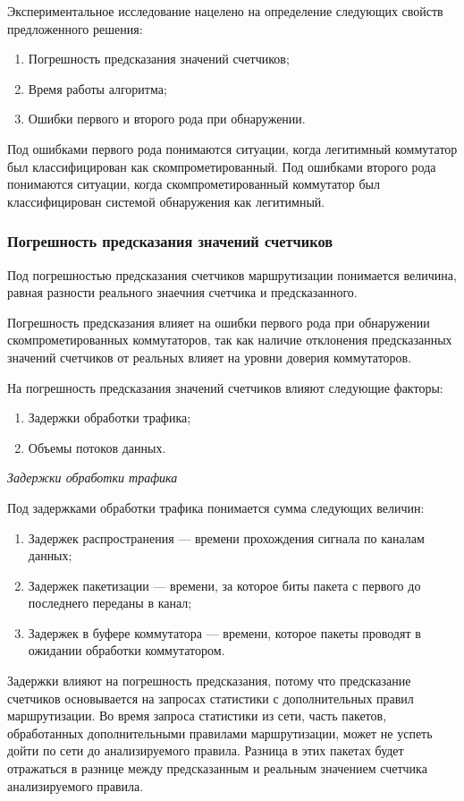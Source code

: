 \documentclass[../thesis.tex]{subfiles}
\begin{document}
Экспериментальное исследование нацелено на определение следующих свойств предложенного решения:
\begin{enumerate}
\item Погрешность предсказания значений счетчиков;
\item Время работы алгоритма;
\item Ошибки первого и второго рода при обнаружении.
\end{enumerate}

Под ошибками первого рода понимаются ситуации, когда легитимный коммутатор был классифицирован как скомпрометированный.
Под ошибками второго рода понимаются ситуации, когда скомпрометированный коммутатор был классифицирован системой обнаружения как легитимный.

\subsubsection{Погрешность предсказания значений счетчиков}

Под погрешностью предсказания счетчиков маршрутизации понимается величина, равная разности реального знаечния счетчика и предсказанного.

Погрешность предсказания влияет на ошибки первого рода при обнаружении скомпрометированных коммутаторов, так как наличие отклонения предсказанных значений счетчиков от реальных влияет на уровни доверия коммутаторов.

На погрешность предсказания значений счетчиков влияют следующие факторы:
\begin{enumerate}
\item Задержки обработки трафика;
\item Объемы потоков данных.
\end{enumerate}

\textit{Задержки обработки трафика}

Под задержками обработки трафика понимается сумма следующих величин:
\begin{enumerate}
\item Задержек распространения --- времени прохождения сигнала по каналам данных;
\item Задержек пакетизации --- времени, за которое биты пакета с первого до последнего переданы в канал;
\item Задержек в буфере коммутатора --- времени, которое пакеты проводят в ожидании обработки коммутатором.
\end{enumerate}

Задержки влияют на погрешность предсказания, потому что предсказание счетчиков основывается на запросах статистики с дополнительных правил маршрутизации.
Во время запроса статистики из сети, часть пакетов, обработанных дополнительными правилами маршрутизации, может не успеть дойти по сети до анализируемого правила.
Разница в этих пакетах будет отражаться в разнице между предсказанным и реальным значением счетчика анализируемого правила.
\end{document}
